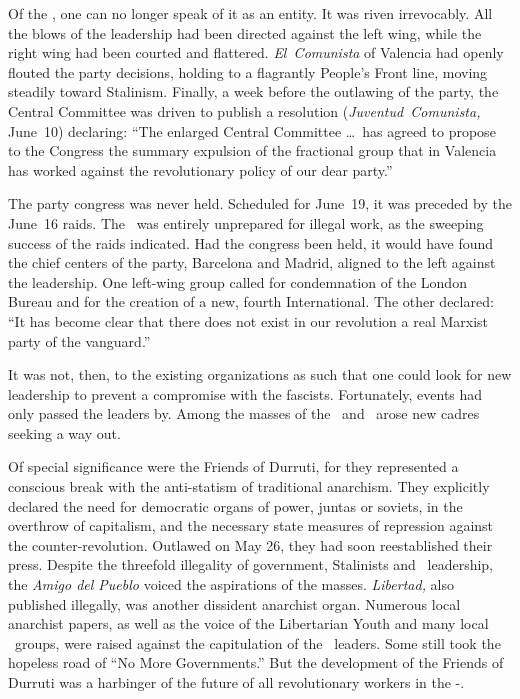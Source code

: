 Of the \POUM\kn, one can no longer speak of it as an entity. It was riv\-en irrevocably. All the blows of the leadership had been directed against the left wing, while the right wing had been courted and flattered. \emph{El~Comunista} of Valencia had openly flouted the party decisions, holding to a flagrantly People’s Front line, moving steadily toward Stalinism. Finally, a week before the outlawing of the party, the Central Committee was driven to publish a resolution (\emph{Juventud~Comunista,} June~10) declaring: ``The enlarged Central Committee \dots\ has agreed to propose to the Congress the summary expulsion of the fractional group that in Valencia has worked against the revolutionary policy of our dear party.''

The party congress was never held. Scheduled for June~19, it was preceded by the June~16 raids. The \POUM\ was entirely unprepared for illegal work, as the sweeping success of the raids indicated. Had the congress been held, it would have found the chief centers of the party, Barcelona and Madrid, aligned to the left against the leadership. One left-wing group called for condemnation of the London Bureau and for the creation of a new, fourth International. The other declared: ``It has become clear that there does not exist in our revolution a real Marxist party of the vanguard.''

It was not, then, to the existing organizations as such that one could look for new leadership to prevent a compromise with the fascists. Fortunately, events had only passed the leaders by. Among the masses of the \CNT\ and \UGT\ arose new cadres seeking a way out.
\nowidow

Of special significance were the Friends of Durruti, for they represented a conscious break with the anti-statism of traditional anarchism. They explicitly declared the need for democratic organs of power, juntas or soviets, in the overthrow of capitalism, and the necessary state measures of repression against the counter-revolution. Outlawed on May 26, they had soon reestablished their press. Despite the threefold illegality of government, Stalinists and \CNT\ leadership, the \emph{Amigo del Pueblo} voiced the aspirations of the masses. \emph{Libertad,} also published illegally, was another dissident anarchist organ. Numerous local anarchist papers, as well as the voice of the Libertarian Youth and many local \FAI\ groups, were raised against the capitulation of the \CNT\ leaders. Some still took the hopeless road of ``No More Governments.'' But the development of the Friends of Durruti was a harbinger of the future of all revolutionary workers in the \CNT-\FAI.

